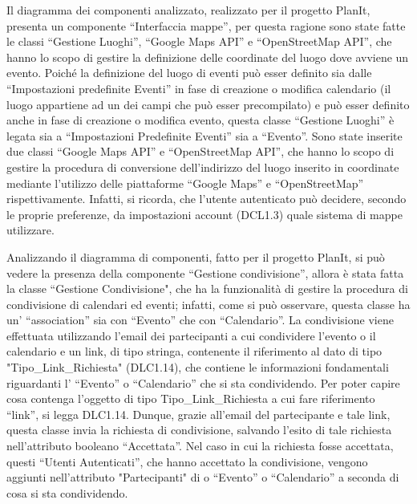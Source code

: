 \begin{listaPersonale}[DCL]{}
\begin{listaPersonale2}[DCL]{}
        Il diagramma dei componenti analizzato, realizzato per il progetto PlanIt, presenta un componente “Interfaccia mappe”, per questa ragione sono state fatte le classi “Gestione Luoghi”, “Google Maps API” e “OpenStreetMap API”, che hanno lo scopo di gestire la definizione delle coordinate del luogo dove avviene un evento. Poiché la definizione del luogo di eventi può esser definito sia dalle “Impostazioni predefinite Eventi” in fase di creazione o modifica calendario (il luogo appartiene ad un dei campi che può esser precompilato) e può esser definito anche in fase di creazione o modifica evento, questa classe “Gestione Luoghi” è legata sia a “Impostazioni Predefinite Eventi” sia a “Evento”.
        Sono state inserite due classi “Google Maps API” e “OpenStreetMap API”, che hanno lo scopo di gestire la procedura di conversione dell'indirizzo del luogo inserito in coordinate mediante l'utilizzo delle piattaforme “Google Maps” e “OpenStreetMap” rispettivamente. Infatti, si ricorda, che l'utente autenticato può decidere, secondo le proprie preferenze, da impostazioni account (DCL1.3) quale sistema di mappe utilizzare.



        Analizzando il diagramma di componenti, fatto per il progetto PlanIt, si può vedere la presenza della componente “Gestione condivisione”, allora è stata fatta la classe “Gestione Condivisione", che ha la funzionalità di gestire la procedura di condivisione di calendari ed eventi; infatti, come si può osservare, questa classe ha un’ “association” sia con “Evento” che con “Calendario”.  La condivisione viene effettuata utilizzando l’email dei partecipanti a cui condividere l’evento o il calendario e un link, di tipo stringa, contenente il riferimento al dato di tipo "Tipo\_Link\_Richiesta" (DLC1.14), che contiene le informazioni fondamentali riguardanti l’ “Evento” o “Calendario” che si sta condividendo. Per poter capire cosa contenga l’oggetto di tipo Tipo\_Link\_Richiesta a cui fare riferimento “link”, si legga DLC1.14. Dunque, grazie all’email del partecipante e tale link, questa classe invia la richiesta di condivisione, salvando l’esito di tale richiesta nell’attributo booleano “Accettata”. Nel caso in cui la richiesta fosse accettata, questi “Utenti Autenticati”, che hanno accettato la condivisione, vengono aggiunti nell’attributo "Partecipanti" di o “Evento” o “Calendario” a seconda di cosa si sta condividendo.

    \end{listaPersonale2}



\end{listaPersonale}
